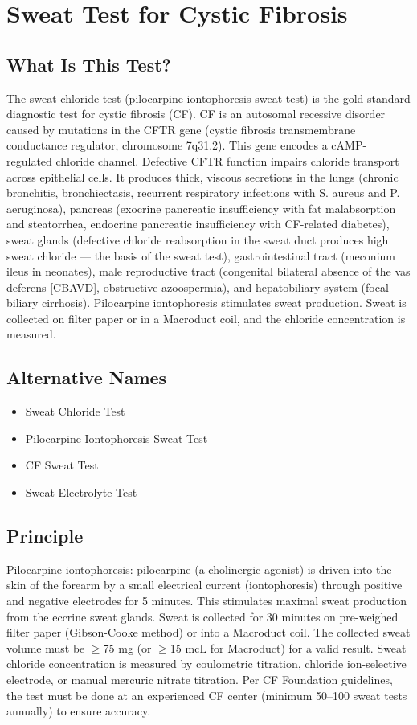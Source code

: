 \chapter{Sweat Test for Cystic Fibrosis}
\section*{What Is This Test?}
The sweat chloride test (pilocarpine iontophoresis sweat test) is the gold standard diagnostic test for cystic fibrosis (CF). CF is an autosomal recessive disorder caused by mutations in the CFTR gene (cystic fibrosis transmembrane conductance regulator, chromosome 7q31.2). This gene encodes a cAMP-regulated chloride channel. Defective CFTR function impairs chloride transport across epithelial cells. It produces thick, viscous secretions in the lungs (chronic bronchitis, bronchiectasis, recurrent respiratory infections with S. aureus and P. aeruginosa), pancreas (exocrine pancreatic insufficiency with fat malabsorption and steatorrhea, endocrine pancreatic insufficiency with CF-related diabetes), sweat glands (defective chloride reabsorption in the sweat duct produces high sweat chloride --- the basis of the sweat test), gastrointestinal tract (meconium ileus in neonates), male reproductive tract (congenital bilateral absence of the vas deferens [CBAVD], obstructive azoospermia), and hepatobiliary system (focal biliary cirrhosis). Pilocarpine iontophoresis stimulates sweat production. Sweat is collected on filter paper or in a Macroduct coil, and the chloride concentration is measured.
\section*{Alternative Names}
\begin{itemize}
  \item Sweat Chloride Test
  \item Pilocarpine Iontophoresis Sweat Test
  \item CF Sweat Test
  \item Sweat Electrolyte Test
\end{itemize}
\section*{Principle}
Pilocarpine iontophoresis: pilocarpine (a cholinergic agonist) is driven into the skin of the forearm by a small electrical current (iontophoresis) through positive and negative electrodes for 5 minutes. This stimulates maximal sweat production from the eccrine sweat glands. Sweat is collected for 30 minutes on pre-weighed filter paper (Gibson-Cooke method) or into a Macroduct coil. The collected sweat volume must be $\geq$75 mg (or $\geq$15 mcL for Macroduct) for a valid result. Sweat chloride concentration is measured by coulometric titration, chloride ion-selective electrode, or manual mercuric nitrate titration. Per CF Foundation guidelines, the test must be done at an experienced CF center (minimum 50--100 sweat tests annually) to ensure accuracy.
